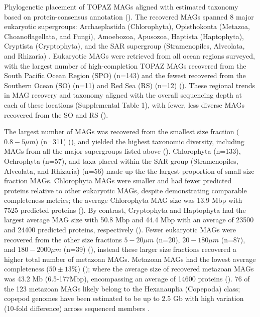 \documentclass[12pt]{article}
\numberwithin{equation}{section}
\begin{document}
Phylogenetic placement of TOPAZ MAGs aligned with estimated taxonomy based on protein-consensus annotation (). The recovered MAGs spanned 8 major eukaryotic supergroups: Archaeplastida (Chlorophyta), Opisthokonta (Metazoa, Choanoflagellata, and Fungi), Amoebozoa, Apusozoa, Haptista (Haptophyta), Cryptista (Cryptophyta), and the SAR supergroup (Stramenopiles, Alveolata, and Rhizaria) \citep{Burki_2020}. Eukaryotic MAGs were retrieved from all ocean regions surveyed, with the largest number of high-completion TOPAZ MAGs recovered from the South Pacific Ocean Region (SPO) (n=143) and the fewest recovered from the Southern Ocean (SO) (n=11) and Red Sea (RS) (n=12) (). These regional trends in MAG recovery and taxonomy aligned with the overall sequencing depth at each of these locations (Supplemental Table 1), with fewer, less diverse MAGs recovered from the SO and RS ().

The largest number of MAGs was recovered from the smallest size fraction ($0.8-5 \mu m$) (n=311) (), and yielded the highest taxonomic diversity, including MAGs from all the major supergroups listed above (). Chlorophyta (n=133), Ochrophyta (n=57), and taxa placed within the SAR group (Stramenopiles, Alveolata, and Rhizaria) (n=56) made up the  the largest proportion of small size fraction MAGs. Chlorophyta MAGs were smaller and had fewer predicted proteins relative to other eukaryotic MAGs, despite demonstrating comparable completeness metrics; the average Chlorophyta MAG size was 13.9 Mbp with 7525 predicted proteins (). By contrast, Cryptophyta and Haptophyta had the largest average MAG size with 50.8 Mbp and 44.4 Mbp with an average of 23500 and 24400 predicted proteins, respectively (). Fewer eukaryotic MAGs were recovered from the other size fractions $5-20\mu m$ (n=20), $20-180 \mu m$ (n=87), and $180-2000\mu m$ (n=39) (), instead these larger size fractions recovered a higher total number of metazoan MAGs. Metazoan MAGs had the lowest average completeness ($50 \pm 13\%$) (); where the average size of recovered metazoan MAGs was 43.2 Mb (6.5-177Mbp), encompassing an average of 14600 proteins (). 76 of the 123 metazoan MAGs likely belong to the  Hexanauplia (Copepoda) class; copepod genomes have been estimated to be up to 2.5 Gb with high variation (10-fold difference) across sequenced members \citep{Jorgensen_2019}. 
\end{document}
